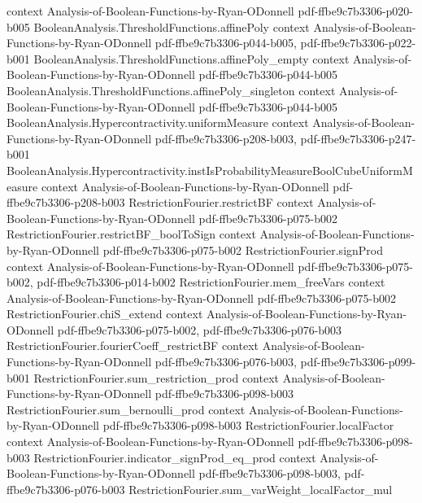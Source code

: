 \begin{lemma}
  {context}
  {Analysis-of-Boolean-Functions-by-Ryan-ODonnell}
  {pdf-ffbe9c7b3306-p020-b005}
\proofstep
  {BooleanAnalysis.ThresholdFunctions.affinePoly}
  {context}
  {Analysis-of-Boolean-Functions-by-Ryan-ODonnell}
  {pdf-ffbe9c7b3306-p044-b005,
    pdf-ffbe9c7b3306-p022-b001}
\proofstep
  {BooleanAnalysis.ThresholdFunctions.affinePoly_empty}
  {context}
  {Analysis-of-Boolean-Functions-by-Ryan-ODonnell}
  {pdf-ffbe9c7b3306-p044-b005}
\proofstep
  {BooleanAnalysis.ThresholdFunctions.affinePoly_singleton}
  {context}
  {Analysis-of-Boolean-Functions-by-Ryan-ODonnell}
  {pdf-ffbe9c7b3306-p044-b005}
\proofstep
  {BooleanAnalysis.Hypercontractivity.uniformMeasure}
  {context}
  {Analysis-of-Boolean-Functions-by-Ryan-ODonnell}
  {pdf-ffbe9c7b3306-p208-b003,
    pdf-ffbe9c7b3306-p247-b001}
\proofstep
  {BooleanAnalysis.Hypercontractivity.instIsProbabilityMeasureBoolCubeUniformMeasure}
  {context}
  {Analysis-of-Boolean-Functions-by-Ryan-ODonnell}
  {pdf-ffbe9c7b3306-p208-b003}
\proofstep
  {RestrictionFourier.restrictBF}
  {context}
  {Analysis-of-Boolean-Functions-by-Ryan-ODonnell}
  {pdf-ffbe9c7b3306-p075-b002}
\proofstep
  {RestrictionFourier.restrictBF_boolToSign}
  {context}
  {Analysis-of-Boolean-Functions-by-Ryan-ODonnell}
  {pdf-ffbe9c7b3306-p075-b002}
\proofstep
  {RestrictionFourier.signProd}
  {context}
  {Analysis-of-Boolean-Functions-by-Ryan-ODonnell}
  {pdf-ffbe9c7b3306-p075-b002,
    pdf-ffbe9c7b3306-p014-b002}
\proofstep
  {RestrictionFourier.mem_freeVars}
  {context}
  {Analysis-of-Boolean-Functions-by-Ryan-ODonnell}
  {pdf-ffbe9c7b3306-p075-b002}
\proofstep
  {RestrictionFourier.chiS_extend}
  {context}
  {Analysis-of-Boolean-Functions-by-Ryan-ODonnell}
  {pdf-ffbe9c7b3306-p075-b002,
    pdf-ffbe9c7b3306-p076-b003}
\proofstep
  {RestrictionFourier.fourierCoeff_restrictBF}
  {context}
  {Analysis-of-Boolean-Functions-by-Ryan-ODonnell}
  {pdf-ffbe9c7b3306-p076-b003,
    pdf-ffbe9c7b3306-p099-b001}
\proofstep
  {RestrictionFourier.sum_restriction_prod}
  {context}
  {Analysis-of-Boolean-Functions-by-Ryan-ODonnell}
  {pdf-ffbe9c7b3306-p098-b003}
\proofstep
  {RestrictionFourier.sum_bernoulli_prod}
  {context}
  {Analysis-of-Boolean-Functions-by-Ryan-ODonnell}
  {pdf-ffbe9c7b3306-p098-b003}
\proofstep
  {RestrictionFourier.localFactor}
  {context}
  {Analysis-of-Boolean-Functions-by-Ryan-ODonnell}
  {pdf-ffbe9c7b3306-p098-b003}
\proofstep
  {RestrictionFourier.indicator_signProd_eq_prod}
  {context}
  {Analysis-of-Boolean-Functions-by-Ryan-ODonnell}
  {pdf-ffbe9c7b3306-p098-b003,
    pdf-ffbe9c7b3306-p076-b003}
\proofstep
  {RestrictionFourier.sum_varWeight_localFactor_mul}

\end{lemma}
